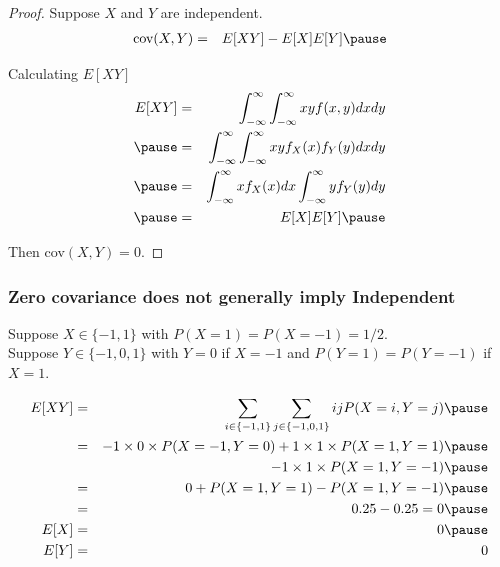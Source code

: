 \documentclass[handout]{beamer}
\numberwithin{equation}{section}
\begin{document}
\begin{frame}
\begin{small}
\begin{proof}
Suppose $X$ and $Y$ are independent.  \pause 
\begin{eqnarray}
\text{cov}(X, Y) & = & E[XY] - E[X]E[Y] \nonumber  \pause 
\end{eqnarray}

Calculating $E[XY]$ \pause 
\begin{eqnarray}
E[XY] & = & \int_{-\infty}^{\infty} \int_{-\infty}^{\infty} x y f(x,y)dxdy \nonumber \\ \pause 
& =& \int_{-\infty}^{\infty} \int_{-\infty}^{\infty} x y f_{X}(x) f_{Y}(y)dxdy \nonumber \\ \pause 
& = & \int_{-\infty}^{\infty} x f_{X}(x) dx \int_{-\infty}^{\infty} y f_{Y}(y) dy \nonumber \\ \pause 
& = & E[X] E[Y] \nonumber \pause 
\end{eqnarray}

Then cov$(X,Y) = 0$.


\end{proof}

\end{small}


\end{frame}


\begin{frame}
\frametitle{Zero covariance does not \alert{generally} imply Independent}
Suppose $X \in \{-1, 1\}$ with $P(X = 1) = P(X = -1) = 1/2$.  \\
Suppose $Y \in \{-1, 0,1\}$ with $Y = 0 $ if $X = -1$ and $P(Y = 1) = P(Y= -1) $ if $X = 1$.  \\

\begin{small}
\begin{eqnarray}
E[XY] & = & \sum_{i \in \{-1, 1\} } \sum_{j \in \{-1, 0, 1\}} i j P(X = i, Y = j) \nonumber \pause\\
& = & -1 \times 0 \times  P(X = -1, Y = 0) + 1 \times 1  \times P(X = 1, Y = 1)  \nonumber  \pause\\
 && - 1 \times 1 \times P(X = 1, Y = -1) \nonumber  \pause\\
 &= & 0 + P(X = 1, Y = 1)  - P(X = 1, Y = -1 ) \nonumber  \pause\\
  & = &  0.25 - 0.25 = 0  \nonumber  \pause\\
E[X] & = &  0 \nonumber  \pause \\
E[Y] & = & 0 \nonumber 
\end{eqnarray}

\end{small}



\end{frame}
\end{document}
